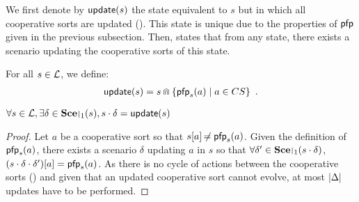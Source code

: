 We first denote by $\mathsf{update}(s)$ the state equivalent to $s$ but in which all cooperative sorts are updated ().
This state is unique due to the properties of $\mathsf{pfp}$ given in the previous subsection.
Then,  states that from any state, there exists a scenario updating the cooperative sorts of this state.
%
\begin{definition}[$\update : \PHl \rightarrow \PHl$]
\label{def:update}
  For all $s \in \mathcal{L}$, we define:
  \begin{align*}
    \mathsf{update}(s) = s \Cap \{ \mathsf{pfp}_{s}(a) \mid a \in CS \} \enspace.
  \end{align*}
\end{definition}
%
\begin{theorem}
\label{th:update}
  $\forall s \in \PHl, \exists \delta \in \restriction{\Sce}{1}(s), s \PHplay \delta = \update(s)$
\end{theorem}
\begin{proof}
  Let $a$ be a cooperative sort so that ${s[a]} \not\nobreak\mkern -2mu = \mathsf{pfp}_s(a)$.
  Given the definition of $\mathsf{pfp}_s(a)$, there exists a scenario $\delta$ updating $a$ in $s$ so that
  $\forall \delta' \in \restriction{\Sce}{1}(s \PHplay \delta)$, ${(s \cdot \delta \cdot \delta')[a]} = \mathsf{pfp}_s(a)$.
  As there is no cycle of actions between the cooperative sorts () and given that an updated cooperative sort cannot evolve, at most $|\Delta|$ updates have to be performed.
\end{proof}

